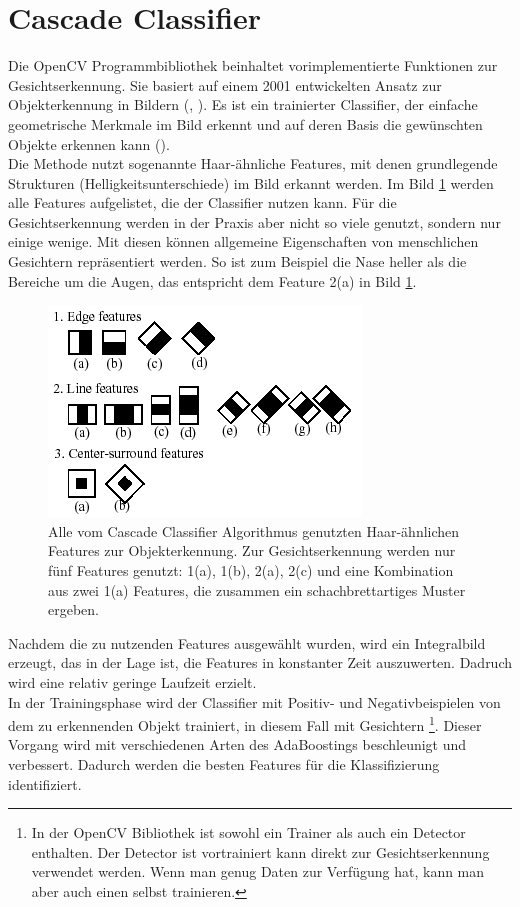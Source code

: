 \section{Cascade Classifier}
Die OpenCV Programmbibliothek beinhaltet vorimplementierte Funktionen zur Gesichtserkennung. Sie basiert auf einem 2001 entwickelten Ansatz zur Objekterkennung in Bildern (\cite{Viola2001}, \cite{Lienhart2002}). Es ist ein trainierter Classifier, der einfache geometrische Merkmale im Bild erkennt und auf deren Basis die gewünschten Objekte erkennen kann (\cite{OpenCV}).\\
Die Methode nutzt sogenannte Haar-ähnliche Features, mit denen grundlegende Strukturen (Helligkeitsunterschiede) im Bild erkannt werden. Im Bild \ref{fig:haarfeatures} werden alle Features aufgelistet, die der Classifier nutzen kann. Für die Gesichtserkennung werden in der Praxis aber nicht so viele genutzt, sondern nur einige wenige. Mit diesen können allgemeine Eigenschaften von menschlichen Gesichtern repräsentiert werden. So ist zum Beispiel die Nase heller als die Bereiche um die Augen, das entspricht dem Feature 2(a) in Bild \ref{fig:haarfeatures}.\\
\begin{figure}
	\centering
	\includegraphics[width=0.5\linewidth]{images/haarfeatures.png}
	\caption{Alle vom Cascade Classifier Algorithmus genutzten Haar-ähnlichen Features zur Objekterkennung. Zur Gesichtserkennung werden nur fünf Features genutzt: 1(a), 1(b), 2(a), 2(c) und eine Kombination aus zwei 1(a) Features, die zusammen ein schachbrettartiges Muster ergeben.}
	\label{fig:haarfeatures}
\end{figure}
Nachdem die zu nutzenden Features ausgewählt wurden, wird ein Integralbild erzeugt, das in der Lage ist, die Features in konstanter Zeit auszuwerten. Dadruch wird eine relativ geringe Laufzeit erzielt.\\
In der Trainingsphase wird der Classifier mit Positiv- und Negativbeispielen von dem zu erkennenden Objekt trainiert, in diesem Fall mit Gesichtern \footnote{In der OpenCV Bibliothek ist sowohl ein Trainer als auch ein Detector enthalten. Der Detector ist vortrainiert kann direkt zur Gesichtserkennung verwendet werden. Wenn man genug Daten zur Verfügung hat, kann man aber auch einen selbst trainieren.}. Dieser Vorgang wird mit verschiedenen Arten des AdaBoostings beschleunigt und verbessert. Dadurch werden die besten Features für die Klassifizierung identifiziert. \\
